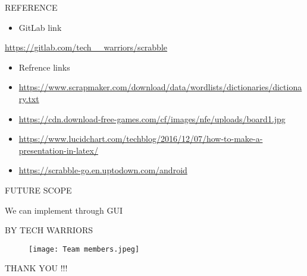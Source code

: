 \documentclass[13.5pt]{beamer}
\begin{document}
\begin{frame}{REFERENCE}
     \begin{itemize}
         \item GitLab link
     \end{itemize}                       
\url{https://gitlab.com/tech__warriors/scrabble}
   
\end{frame}

\begin{frame}
\begin{itemize}
\item Refrence links
    \item \url{https://www.scrapmaker.com/download/data/wordlists/dictionaries/dictionary.txt}
\item \url{https://cdn.download-free-games.com/cf/images/nfe/uploads/board1.jpg}
\item \url{https://www.lucidchart.com/techblog/2016/12/07/how-to-make-a-presentation-in-latex/}
\item \url{https://scrabble-go.en.uptodown.com/android}
\end{itemize}



\end{frame}

\begin{frame}{FUTURE SCOPE}

    We can implement through GUI
\end{frame}

\begin{frame}{BY TECH WARRIORS}

\begin{figure}[htp]
    \centering
    \texttt{[image: Team members.jpeg]}
    \label{fig:Team members}
\end{figure}


\end{frame}
\begin{frame}

\centerline{THANK YOU !!!}

\end{frame}
\end{document}
